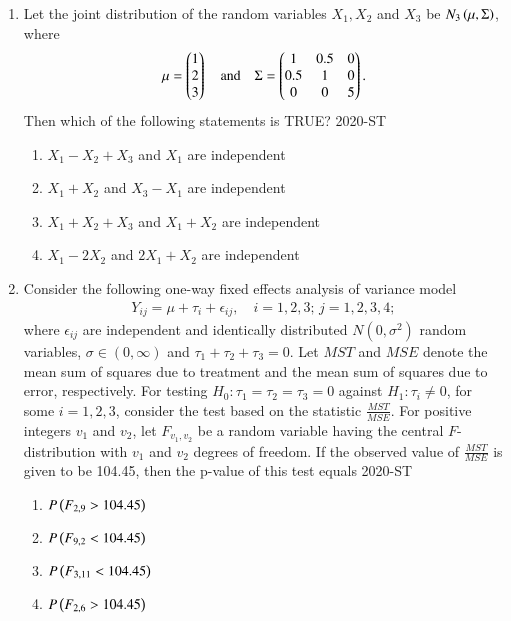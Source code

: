 \documentclass[journal]{IEEEtran}
\begin{document}
\begin{enumerate}
\item Let the joint distribution of the random variables $X_1, X_2$ and $X_3$ be $N_3\left(\mu, \Sigma\right)$, where 
\begin{align*}
\mu = \begin{pmatrix}1 \\ 2 \\ 3\end{pmatrix} \quad \text{and} \quad \Sigma = \begin{pmatrix}1 & 0.5 & 0 \\ 0.5 & 1 & 0 \\ 0 & 0 & 5\end{pmatrix}.
\end{align*}
Then which of the following statements is TRUE?
\hfill{2020-ST}
\begin{enumerate}
    \item $X_1 - X_2 + X_3$ and $X_1$ are independent
    \item $X_1 + X_2$ and $X_3 - X_1$ are independent
    \item $X_1 + X_2 + X_3$ and $X_1 + X_2$ are independent
    \item $X_1 - 2X_2$ and $2X_1 + X_2$ are independent
\end{enumerate}

\item Consider the following one-way fixed effects analysis of variance model
\begin{align*}
Y_{ij} = \mu + \tau_i + \epsilon_{ij}, \quad i = 1, 2, 3; \, j = 1, 2, 3, 4;
\end{align*}
where $\epsilon_{ij}$ are independent and identically distributed $N(0, \sigma^2)$ random variables, $\sigma \in (0, \infty)$ and $\tau_1 + \tau_2 + \tau_3 = 0$. Let $MST$ and $MSE$ denote the mean sum of squares due to treatment and the mean sum of squares due to error, respectively. For testing $H_0: \tau_1 = \tau_2 = \tau_3 = 0$ against $H_1: \tau_i \neq 0$, for some $i = 1, 2, 3$, consider the test based on the statistic $\frac{MST}{MSE}$. For positive integers $v_1$ and $v_2$, let $F_{v_1, v_2}$ be a random variable having the central $F$-distribution with $v_1$ and $v_2$ degrees of freedom. If the observed value of $\frac{MST}{MSE}$ is given to be 104.45, then the p-value of this test equals
\hfill{2020-ST}
\begin{enumerate}
    \item $P\left(F_{2,9} > 104.45\right)$
    \item $P\left(F_{9,2} < 104.45\right)$
    \item $P\left(F_{3,11} < 104.45\right)$
    \item $P\left(F_{2,6} > 104.45\right)$
\end{enumerate}


\end{enumerate}
\end{document}
